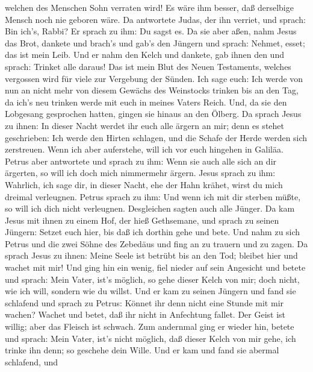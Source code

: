 welchen des Menschen Sohn verraten wird! Es wäre ihm besser, daß
derselbige Mensch noch nie geboren wäre.  Da antwortete
Judas, der ihn verriet, und sprach: Bin ich's, Rabbi? Er sprach zu ihm:
Du sagst es.  Da sie aber aßen, nahm Jesus das Brot,
dankete und brach's und gab's den Jüngern und sprach: Nehmet, esset; das
ist mein Leib.  Und er nahm den Kelch und dankete, gab
ihnen den und sprach: Trinket alle daraus!  Das ist mein
Blut des Neuen Testaments, welches vergossen wird für viele zur
Vergebung der Sünden.  Ich sage euch: Ich werde von nun an
nicht mehr von diesem Gewächs des Weinstocks trinken bis an den Tag, da
ich's neu trinken werde mit euch in meines Vaters Reich. 
Und, da sie den Lobgesang gesprochen hatten, gingen sie hinaus an den
Ölberg.  Da sprach Jesus zu ihnen: In dieser Nacht werdet
ihr euch alle ärgern an mir; denn es stehet geschrieben: Ich werde den
Hirten schlagen, und die Schafe der Herde werden sich zerstreuen.
 Wenn ich aber auferstehe, will ich vor euch hingehen in
Galiläa.  Petrus aber antwortete und sprach zu ihm: Wenn
sie auch alle sich an dir ärgerten, so will ich doch mich nimmermehr
ärgern.  Jesus sprach zu ihm: Wahrlich, ich sage dir, in
dieser Nacht, ehe der Hahn krähet, wirst du mich dreimal verleugnen.
 Petrus sprach zu ihm: Und wenn ich mit dir sterben müßte,
so will ich dich nicht verleugnen. Desgleichen sagten auch alle Jünger.
 Da kam Jesus mit ihnen zu einem Hof, der hieß Gethsemane,
und sprach zu seinen Jüngern: Setzet euch hier, bis daß ich dorthin gehe
und bete.  Und nahm zu sich Petrus und die zwei Söhne des
Zebedäus und fing an zu trauern und zu zagen.  Da sprach
Jesus zu ihnen: Meine Seele ist betrübt bis an den Tod; bleibet hier und
wachet mit mir!  Und ging hin ein wenig, fiel nieder auf
sein Angesicht und betete und sprach: Mein Vater, ist's möglich, so gehe
dieser Kelch von mir; doch nicht, wie ich will, sondern wie du willst.
 Und er kam zu seinen Jüngern und fand sie schlafend und
sprach zu Petrus: Könnet ihr denn nicht eine Stunde mit mir wachen?
 Wachet und betet, daß ihr nicht in Anfechtung fallet. Der
Geist ist willig; aber das Fleisch ist schwach.  Zum
andernmal ging er wieder hin, betete und sprach: Mein Vater, ist's nicht
möglich, daß dieser Kelch von mir gehe, ich trinke ihn denn; so geschehe
dein Wille.  Und er kam und fand sie abermal schlafend, und
